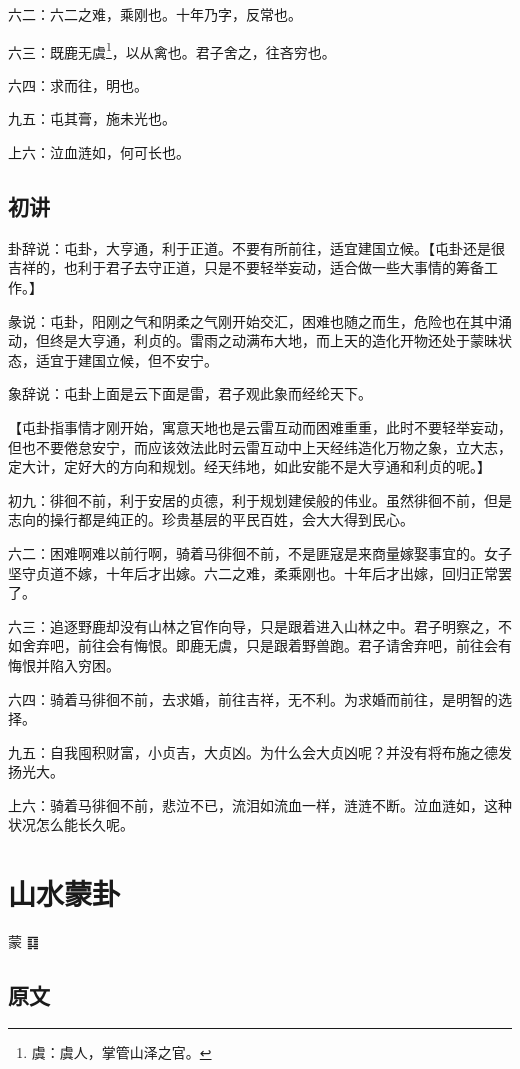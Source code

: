 \documentclass[12pt,oneside]{book}
\begin{document}
六二：六二之难，乘刚也。十年乃字，反常也。

六三：既鹿无虞\footnote{虞：虞人，掌管山泽之官。}，以从禽也。君子舍之，往吝穷也。

六四：求而往，明也。

九五：屯其膏，施未光也。

上六：泣血涟如，何可长也。

\section{初讲}
卦辞说：屯卦，大亨通，利于正道。不要有所前往，适宜建国立候。【屯卦还是很吉祥的，也利于君子去守正道，只是不要轻举妄动，适合做一些大事情的筹备工作。】

彖说：屯卦，阳刚之气和阴柔之气刚开始交汇，困难也随之而生，危险也在其中涌动，但终是大亨通，利贞的。雷雨之动满布大地，而上天的造化开物还处于蒙昧状态，适宜于建国立候，但不安宁。

象辞说：屯卦上面是云下面是雷，君子观此象而经纶天下。

【屯卦指事情才刚开始，寓意天地也是云雷互动而困难重重，此时不要轻举妄动，但也不要倦怠安宁，而应该效法此时云雷互动中上天经纬造化万物之象，立大志，定大计，定好大的方向和规划。经天纬地，如此安能不是大亨通和利贞的呢。】

初九：徘徊不前，利于安居的贞德，利于规划建侯般的伟业。虽然徘徊不前，但是志向的操行都是纯正的。珍贵基层的平民百姓，会大大得到民心。

六二：困难啊难以前行啊，骑着马徘徊不前，不是匪寇是来商量嫁娶事宜的。女子坚守贞道不嫁，十年后才出嫁。六二之难，柔乘刚也。十年后才出嫁，回归正常罢了。

六三：追逐野鹿却没有山林之官作向导，只是跟着进入山林之中。君子明察之，不如舍弃吧，前往会有悔恨。即鹿无虞，只是跟着野兽跑。君子请舍弃吧，前往会有悔恨并陷入穷困。

六四：骑着马徘徊不前，去求婚，前往吉祥，无不利。为求婚而前往，是明智的选择。

九五：自我囤积财富，小贞吉，大贞凶。为什么会大贞凶呢？并没有将布施之德发扬光大。

上六：骑着马徘徊不前，悲泣不已，流泪如流血一样，涟涟不断。泣血涟如，这种状况怎么能长久呢。



\chapter{山水蒙卦}
蒙 {\Large ䷃}

\section{原文}
\end{document}
